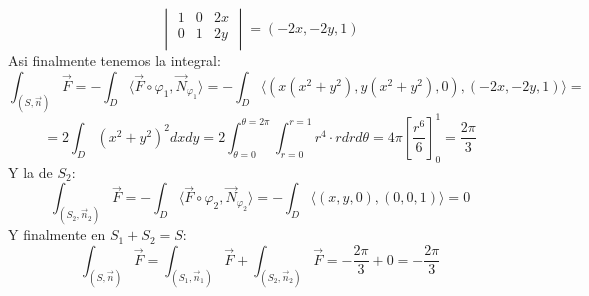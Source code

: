 {$$\begin{vmatrix}
        1         & 0         & 2x        \\
        0         & 1         & 2y        \\
    \end{vmatrix} = (-2x, -2y, 1)$$
    Asi finalmente tenemos la integral:
    $$\int_{(S, \vec{n})} \vec{F} = -\int_D \langle \vec{F} \circ \varphi_1, \vec{N}_{\varphi_1} \rangle = -\int_D \langle (x(x^2+y^2), y(x^2+y^2), 0), (-2x, -2y, 1) \rangle =$$
    $$ = 2\int_D (x^2+y^2)^2 dxdy = 2\int_{\theta = 0}^{\theta = 2\pi} \int_{r = 0}^{r = 1} r^4 \cdot r dr d\theta = 4\pi \left[ \frac{r^6}{6} \right]_0^1 = \frac{2\pi}{3}$$
    Y la de $S_2$:
    $$ \int_{(S_2, \vec{n}_2)} \vec{F} = -\int_D \langle \vec{F} \circ \varphi_2, \vec{N}_{\varphi_2} \rangle = -\int_D \langle (x,y,0), (0,0,1) \rangle = 0$$
    Y finalmente en $S_1 + S_2 = S$:
    $$\int_{(S, \vec{n})} \vec{F} = \int_{(S_1, \vec{n}_1)} \vec{F} + \int_{(S_2, \vec{n}_2)} \vec{F} = -\frac{2\pi}{3} + 0 = -\frac{2\pi}{3}$$   
}